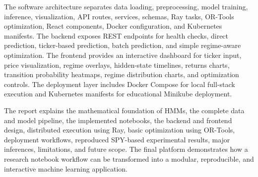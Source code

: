 \documentclass[12pt,a4paper]{report}
\begin{document}
The software architecture separates data loading, preprocessing, model training, inference, visualization, API routes, services, schemas, Ray tasks, OR-Tools optimization, React components, Docker configuration, and Kubernetes manifests. The backend exposes REST endpoints for health checks, direct prediction, ticker-based prediction, batch prediction, and simple regime-aware optimization. The frontend provides an interactive dashboard for ticker input, price visualization, regime overlays, hidden-state timelines, returns charts, transition probability heatmaps, regime distribution charts, and optimization controls. The deployment layer includes Docker Compose for local full-stack execution and Kubernetes manifests for educational Minikube deployment.

The report explains the mathematical foundation of HMMs, the complete data and model pipeline, the implemented notebooks, the backend and frontend design, distributed execution using Ray, basic optimization using OR-Tools, deployment workflows, reproduced SPY-based experimental results, major inferences, limitations, and future scope. The final platform demonstrates how a research notebook workflow can be transformed into a modular, reproducible, and interactive machine learning application.

\tableofcontents
\listoftables
\end{document}
